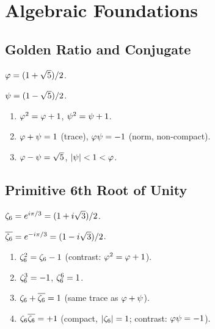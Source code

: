 \chapter{Algebraic Foundations}
\label{ch:algebra}

\section{Golden Ratio and Conjugate}

\begin{definition}
\label{def:phi}
$\varphi = (1+\sqrt5)/2$.
\end{definition}

\begin{definition}
\label{def:psi}
$\psi = (1-\sqrt5)/2$.
\end{definition}

\begin{lemma}
\label{lem:golden-identities}
\begin{enumerate}
  \item $\varphi^2 = \varphi + 1$, \quad $\psi^2 = \psi + 1$.
  \item $\varphi + \psi = 1$ (trace), \quad $\varphi\psi = -1$ (norm, non-compact).
  \item $\varphi - \psi = \sqrt5$, \quad $|\psi| < 1 < \varphi$.
\end{enumerate}
\end{lemma}

\section{Primitive 6th Root of Unity}

\begin{definition}[$\zs$]
\label{def:zeta6}
$\zeta_6 = e^{i\pi/3} = (1 + i\sqrt3)/2$.
\end{definition}

\begin{definition}[$\zsc$]
\label{def:zeta6c}
$\overline{\zeta_6} = e^{-i\pi/3} = (1 - i\sqrt3)/2$.
\end{definition}

\begin{lemma}
\label{lem:eisenstein-identities}
\begin{enumerate}
  \item $\zeta_6^2 = \zeta_6 - 1$ (contrast: $\varphi^2 = \varphi + 1$).
  \item $\zeta_6^3 = -1$, \quad $\zeta_6^6 = 1$.
  \item $\zeta_6 + \overline{\zeta_6} = 1$ (same trace as $\varphi + \psi$).
  \item $\zeta_6\overline{\zeta_6} = +1$ (compact, $|\zeta_6|=1$; contrast: $\varphi\psi = -1$).
\end{enumerate}
\end{lemma}

